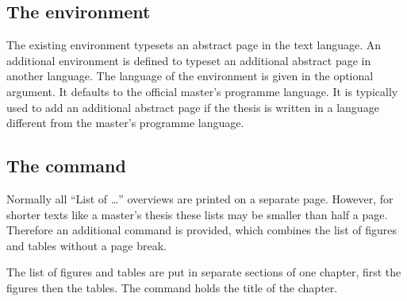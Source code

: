 \subsection[\env{abstract*}]{The  environment}
The existing  environment typesets an abstract page in the
text language. An additional  environment is defined to
typeset an additional abstract page in another language.
The language of the  environment is given in the optional
argument. It defaults to the official master's programme language. It is
typically used to add an additional abstract page if the thesis is written in a
language different from the master's programme language.

\subsection[\cs{listoffiguresandtables}]{%
  The  command}
Normally all ``List of \ldots'' overviews are printed on a separate page.
However, for shorter texts like a master's thesis these lists may be smaller
than half a page. Therefore an additional command
 is provided, which combines the list of
figures and tables without a page break.

The list of figures and tables are put in separate sections of one chapter,
first the figures then the tables. The command
 holds the title of the chapter.


